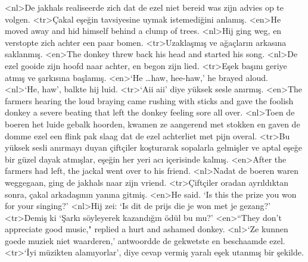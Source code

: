 <nl>De jakhals realiseerde zich dat de ezel niet bereid was zijn advies op te volgen.
<tr>Çakal eşeğin tavsiyesine uymak istemediğini anlamış. 
<en>He moved away and hid himself behind a clump of trees. 
<nl>Hij ging weg, en verstopte zich achter een paar bomen.
<tr>Uzaklaşmış ve ağaçların arkasına saklanmış.
<en>The donkey threw back his head and started his song. 
<nl>De ezel gooide zijn hoofd naar achter, en begon zijn lied.
<tr>Eşek başını geriye atmış ve şarkısına başlamış.
<en>`He …haw, hee-haw,' he brayed aloud. 
<nl>`He, haw', balkte hij luid.
<tr>`Aii aii' diye yüksek sesle anırmış.
<en>The farmers hearing the loud braying came rushing with sticks and gave the foolish donkey a severe beating that left the donkey feeling sore all over. 
<nl>Toen de boeren het luide gebalk hoorden,  kwamen ze aangerend met stokken en gaven de domme ezel een flink pak slaag dat de ezel achterliet met pijn overal.
<tr>Bu yüksek sesli anırmayı duyan çiftçiler koşturarak sopalarla gelmişler ve aptal eşeğe bir güzel dayak atmışlar, eşeğin her yeri acı içerisinde kalmış.
<en>After the farmers had left, the jackal went over to his friend. 
<nl>Nadat de boeren waren weggegaan, ging de jakhals naar zijn vriend.
<tr>Çiftçiler oradan ayrıldıktan sonra, çakal arkadaşının yanına gitmiş.
<en>He said. `Is this the prize you won for your singing?'
<nl>Hij zei: `Is dit de prijs die je won met je gezang?'
<tr>Demiş ki `Şarkı söyleyerek kazandığın ödül bu mu?'
<en>“They don’t appreciate good music," replied a hurt and ashamed donkey. 
<nl>`Ze kunnen goede muziek niet waarderen,' antwoordde de gekwetste en beschaamde ezel.
<tr>`İyi müzikten alamıyorlar', diye cevap vermiş yaralı eşek utanmış bir şekilde.
